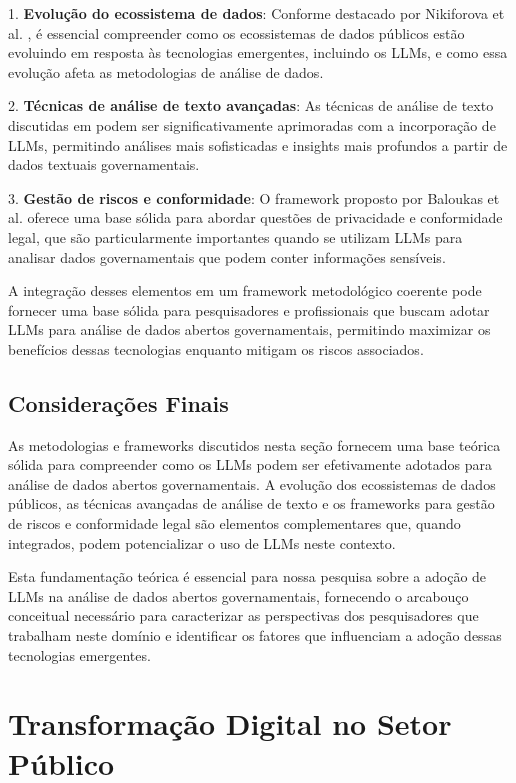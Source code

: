 1. \textbf{Evolução do ecossistema de dados}: Conforme destacado por Nikiforova et al. \cite{ref_37}, é essencial compreender como os ecossistemas de dados públicos estão evoluindo em resposta às tecnologias emergentes, incluindo os LLMs, e como essa evolução afeta as metodologias de análise de dados.

2. \textbf{Técnicas de análise de texto avançadas}: As técnicas de análise de texto discutidas em \cite{Rizun2025} podem ser significativamente aprimoradas com a incorporação de LLMs, permitindo análises mais sofisticadas e insights mais profundos a partir de dados textuais governamentais.

3. \textbf{Gestão de riscos e conformidade}: O framework proposto por Baloukas et al. \cite{Baloukas2024} oferece uma base sólida para abordar questões de privacidade e conformidade legal, que são particularmente importantes quando se utilizam LLMs para analisar dados governamentais que podem conter informações sensíveis.

A integração desses elementos em um framework metodológico coerente pode fornecer uma base sólida para pesquisadores e profissionais que buscam adotar LLMs para análise de dados abertos governamentais, permitindo maximizar os benefícios dessas tecnologias enquanto mitigam os riscos associados.

\subsection{Considerações Finais}

As metodologias e frameworks discutidos nesta seção fornecem uma base teórica sólida para compreender como os LLMs podem ser efetivamente adotados para análise de dados abertos governamentais. A evolução dos ecossistemas de dados públicos, as técnicas avançadas de análise de texto e os frameworks para gestão de riscos e conformidade legal são elementos complementares que, quando integrados, podem potencializar o uso de LLMs neste contexto.

Esta fundamentação teórica é essencial para nossa pesquisa sobre a adoção de LLMs na análise de dados abertos governamentais, fornecendo o arcabouço conceitual necessário para caracterizar as perspectivas dos pesquisadores que trabalham neste domínio e identificar os fatores que influenciam a adoção dessas tecnologias emergentes.


\section{Transformação Digital no Setor Público}
